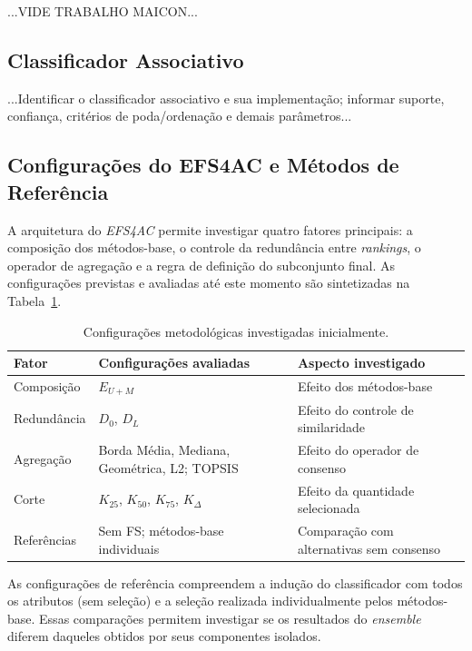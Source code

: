 ...VIDE TRABALHO MAICON...

\subsection{Classificador Associativo}
\label{subsec:exp-integracao}

...Identificar o classificador associativo e sua implementação; informar suporte, confiança, critérios de poda/ordenação e demais parâmetros...

\subsection{Configurações do EFS4AC e Métodos de Referência}\label{subsec:exp-configuracoes}

A arquitetura do \textit{EFS4AC} permite investigar quatro fatores principais:
a composição dos métodos-base, o controle da redundância entre \textit{rankings},
o operador de agregação e a regra de definição do subconjunto final. As
configurações previstas e avaliadas até este momento são sintetizadas na Tabela~\ref{tab:exp-configuracoes}.

\begin{table}[htbp]
    \centering
    \small
    \caption{Configurações metodológicas investigadas inicialmente.}
    \label{tab:exp-configuracoes}
    \renewcommand{\arraystretch}{1.15}
    \begin{tabular}{p{3.2cm}p{5.3cm}p{4.2cm}}
        \hline
        \textbf{Fator} & \textbf{Configurações avaliadas} &
        \textbf{Aspecto investigado} \\
        \hline
        Composição & $E_{U+M}$ & Efeito dos métodos-base \\
        Redundância & $D_0$, $D_L$ & Efeito do controle de similaridade \\
        Agregação & Borda Média, Mediana, Geométrica, L2; TOPSIS &
        Efeito do operador de consenso \\
        Corte & $K_{25}$, $K_{50}$, $K_{75}$, $K_{\Delta}$ &
        Efeito da quantidade selecionada \\
        Referências & Sem FS; métodos-base individuais &
        Comparação com alternativas sem consenso \\
        \hline
    \end{tabular}
\end{table}

As configurações de referência compreendem a indução do classificador com todos
os atributos (sem seleção) e a seleção realizada individualmente pelos métodos-
base. Essas comparações permitem investigar se os resultados do \textit{ensemble}
diferem daqueles obtidos por seus componentes isolados.

